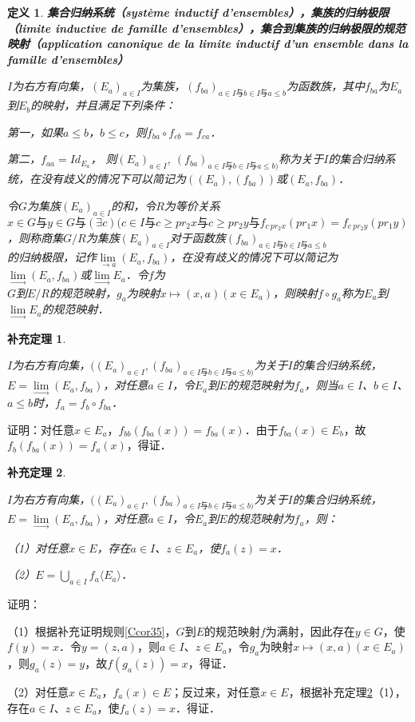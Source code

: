 \documentclass[12pt, a4paper, oneside]{book}
\newtheorem{cor}{补充定理}
\newtheorem{de}{定义}
\begin{document}
			\begin{de}
				\textbf{集合归纳系统（système inductif d'ensembles），集族的归纳极限（limite inductive de famille d'ensembles），集合到集族的归纳极限的规范映射（application canonique de la limite inductif d'un ensemble dans la famille d'ensembles）}
				\par
				$I$为右方有向集，$(E_a)_{a\in I}$为集族，$(f_{ba})_{a\in I\text{与}b\in I\text{与}a\leq b}$为函数族，其中$f_{ba}$为$E_a$到$E_b$的映射，并且满足下列条件：
				\par
				第一，如果$a\leq b$，$b\leq c$，则$f_{ba}\circ f_{cb}=f_{ca}$．
				\par
				第二，$f_{aa}=Id_{E_a}$，
				则$(E_a)_{a\in I}$, $(f_{ba})_{a\in I\text{与}b\in I\text{与}a\leq b)}$称为关于$I$的集合归纳系统，在没有歧义的情况下可以简记为$((E_a), (f_{ba}))$或$(E_a, f_{ba})$．
				\par
				令$G$为集族$(E_a)_{a\in I}$的和，令$R$为等价关系$x\in G\text{与}y\in G \text{与}(\exists c)(c\in I\text{与}c\geq pr_2x\text{与}c\geq pr_2y\text{与}f_{c\ pr_2x}(pr_1x)= f_{c\ pr_2y}(pr_1y)$，则称商集$G/R$为集族$(E_a)_{a\in I}$对于函数族$(f_{ba})_{a\in I\text{与}b\in I\text{与}a\leq b}$\\的归纳极限，记作$\lim\limits_{\to a}(E_a, f_{ba})$，在没有歧义的情况下可以简记为$\lim\limits_\to (E_a, f_{ba})$或$\lim\limits_\to E_a$．令$f$为\\$G$到$E/R$的规范映射，$g_a$为映射$x\mapsto (x, a)(x\in E_a)$，则映射$f\circ g_a$称为$E_a$到$\lim\limits_\to E_a$的规范映射．
			\end{de}
			
			\begin{cor}\label{cor423}
				\hfill\par
				$I$为右方有向集，$((E_a)_{a\in I}, (f_{ba})_{a\in I\text{与}b\in I\text{与}a\leq b)}$为关于$I$的集合归纳系统，$E=\lim\limits_\to (E_a, f_{ba})$，对任意$a\in I$，令$E_a$到$E$的规范映射为$f_a$，则当$a\in I$、$b\in I$、$a\leq b$时，$f_a=f_b\circ f_{ba}$．
			\end{cor}
			证明：对任意$x\in E_a$，$f_{bb}(f_{ba}(x))=f_{ba}(x)$．由于$f_{ba}(x)\in E_b$，故$f_b(f_{ba}(x))=f_a(x)$，得证．
			
			\begin{cor}\label{cor424}
				\hfill\par
				$I$为右方有向集，$((E_a)_{a\in I}, (f_{ba})_{a\in I\text{与}b\in I\text{与}a\leq b)}$为关于$I$的集合归纳系统，$E=\lim\limits_\to (E_a, f_{ba})$，对任意$a\in I$，令$E_a$到$E$的规范映射为$f_a$，则：
				\par
				（1）对任意$x\in E$，存在$a\in I$、$z\in E_a$，使$f_a(z)=x$．
				\par
				（2）$E=\bigcup\limits_{a\in I}f_a\langle E_a\rangle$．
			\end{cor}
			证明：
			\par
			（1）根据补充证明规则\ref{Ccor35}，$G$到$E$的规范映射$f$为满射，因此存在$y\in G$，使$f(y)=x$．令$y=(z, a)$，则$a\in I$、$z\in E_a$，令$g_a$为映射$x\mapsto (x, a)(x\in E_a)$，则$g_a(z) =y$，故$f(g_a(z))=x$，得证．
			\par
			（2）对任意$x\in E_a$，$f_a(x)\in E$；反过来，对任意$x\in E$，根据补充定理\ref{cor424}（1），存在$a\in I$、$z\in E_a$，使$f_a(z)=x$．得证．
			
\end{document}
